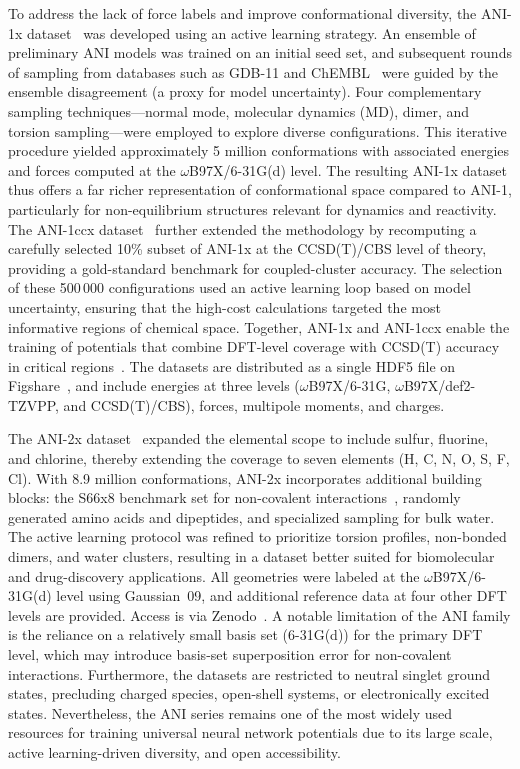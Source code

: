 \documentclass[12pt]{article}
\begin{document}
To address the lack of force labels and improve conformational diversity, the ANI-1x dataset~\cite{ds26-3} was developed using an active learning strategy. An ensemble of preliminary ANI models was trained on an initial seed set, and subsequent rounds of sampling from databases such as GDB-11 and ChEMBL~\cite{ds26-95,ds26-96,ds26-111} were guided by the ensemble disagreement (a proxy for model uncertainty). Four complementary sampling techniques—normal mode, molecular dynamics (MD), dimer, and torsion sampling—were employed to explore diverse configurations. This iterative procedure yielded approximately 5 million conformations with associated energies and forces computed at the \(\omega\)B97X/6-31G(d) level. The resulting ANI-1x dataset thus offers a far richer representation of conformational space compared to ANI-1, particularly for non-equilibrium structures relevant for dynamics and reactivity. The ANI-1ccx dataset~\cite{ds26-3} further extended the methodology by recomputing a carefully selected 10\% subset of ANI-1x at the CCSD(T)/CBS level of theory, providing a gold-standard benchmark for coupled-cluster accuracy. The selection of these 500\,000 configurations used an active learning loop based on model uncertainty, ensuring that the high-cost calculations targeted the most informative regions of chemical space. Together, ANI-1x and ANI-1ccx enable the training of potentials that combine DFT-level coverage with CCSD(T) accuracy in critical regions~\cite{ds26-140,ds26-141}. The datasets are distributed as a single HDF5 file on Figshare~\cite{ds26-142}, and include energies at three levels (\(\omega\)B97X/6-31G, \(\omega\)B97X/def2-TZVPP, and CCSD(T)/CBS), forces, multipole moments, and charges.

The ANI-2x dataset~\cite{ds27-8} expanded the elemental scope to include sulfur, fluorine, and chlorine, thereby extending the coverage to seven elements (H, C, N, O, S, F, Cl). With 8.9 million conformations, ANI-2x incorporates additional building blocks: the S66x8 benchmark set for non-covalent interactions~\cite{ds27-144}, randomly generated amino acids and dipeptides, and specialized sampling for bulk water. The active learning protocol was refined to prioritize torsion profiles, non-bonded dimers, and water clusters, resulting in a dataset better suited for biomolecular and drug-discovery applications. All geometries were labeled at the \(\omega\)B97X/6-31G(d) level using Gaussian~09, and additional reference data at four other DFT levels are provided. Access is via Zenodo~\cite{ds27-145}. A notable limitation of the ANI family is the reliance on a relatively small basis set (6-31G(d)) for the primary DFT level, which may introduce basis-set superposition error for non-covalent interactions. Furthermore, the datasets are restricted to neutral singlet ground states, precluding charged species, open-shell systems, or electronically excited states. Nevertheless, the ANI series remains one of the most widely used resources for training universal neural network potentials due to its large scale, active learning-driven diversity, and open accessibility.
\end{document}

